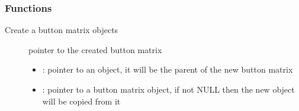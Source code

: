 \documentclass[letterpaper,10pt,english]{sphinxmanual}
\begin{document}
\begin{fulllineitems}

\begin{fulllineitems}
\label{\detokenize{object-types/btnm:_CPPv424LV_BTNM_STYLE_BTN_TGL_PR}}%
\pysigstartmultiline
{}%
\pysigstopmultiline
\end{fulllineitems}


\begin{fulllineitems}
\label{\detokenize{object-types/btnm:_CPPv421LV_BTNM_STYLE_BTN_INA}}%
\pysigstartmultiline
{}%
\pysigstopmultiline
\end{fulllineitems}


\end{fulllineitems}

\subsubsection*{Functions}

\begin{fulllineitems}
\label{\detokenize{object-types/btnm:_CPPv414lv_btnm_createP8lv_obj_tPK8lv_obj_t}}%
\pysigstartmultiline
{}\label{\detokenize{object-types/btnm:lv__btnm_8h_1a0ec99938def76fcc6fc3930f39e0a670}}%
\pysigstopmultiline
Create a button matrix objects \begin{description}
\item[{}] \leavevmode
pointer to the created button matrix 

\item[{}] \leavevmode\begin{itemize}
\item {} 
: pointer to an object, it will be the parent of the new button matrix 

\item {} 
: pointer to a button matrix object, if not NULL then the new object will be copied from it 

\end{itemize}

\end{description}


\end{fulllineitems}
\end{document}
